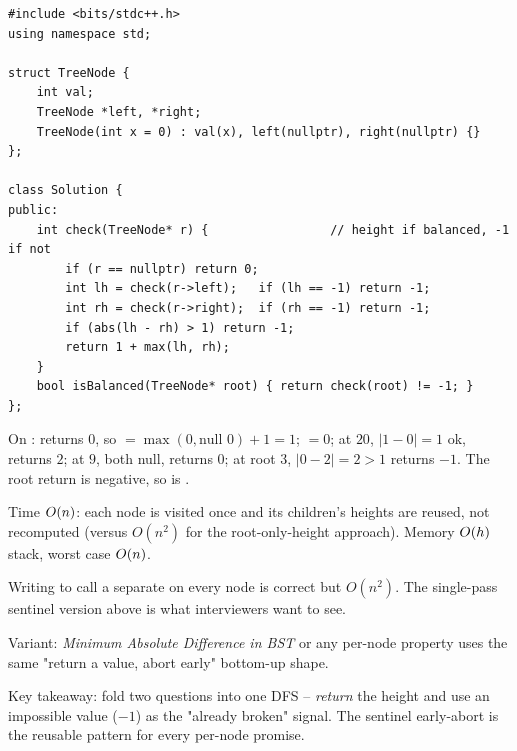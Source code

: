 \begin{lstlisting}[caption={Balanced Binary Tree (LeetCode 110)}, label={lst:c01-balanced}]
#include <bits/stdc++.h>
using namespace std;

struct TreeNode {
    int val;
    TreeNode *left, *right;
    TreeNode(int x = 0) : val(x), left(nullptr), right(nullptr) {}
};

class Solution {
public:
    int check(TreeNode* r) {                 // height if balanced, -1 if not
        if (r == nullptr) return 0;
        int lh = check(r->left);   if (lh == -1) return -1;
        int rh = check(r->right);  if (rh == -1) return -1;
        if (abs(lh - rh) > 1) return -1;
        return 1 + max(lh, rh);
    }
    bool isBalanced(TreeNode* root) { return check(root) != -1; }
};
\end{lstlisting}

\begin{tracebox}
On :  returns $0$, so $=\max(0,\text{null }0)+1=1$;
$=0$; at $20$, $|1-0|=1$ ok, returns $2$; at $9$, both null, returns $0$;
at root $3$, $|0-2|=2>1$ returns $-1$. The root return is negative, so 
is .
\end{tracebox}

\begin{complexitybox}
Time $O(n)$: each node is visited once and its children's heights are reused, not
recomputed (versus $O(n^2)$ for the root-only-height approach). Memory $O(h)$ stack,
worst case $O(n)$.
\end{complexitybox}

\begin{warningbox}
Writing  to call a separate  on every node is correct but
$O(n^2)$. The single-pass sentinel version above is what interviewers want to see.
\end{warningbox}
Variant: \emph{Minimum Absolute Difference in BST} or any per-node property uses the same
"return a value, abort early" bottom-up shape.

\begin{insightbox}
Key takeaway: fold two questions into one DFS -- \emph{return} the height and use an
impossible value ($-1$) as the "already broken" signal. The sentinel early-abort is the
reusable pattern for every per-node promise.
\end{insightbox}

